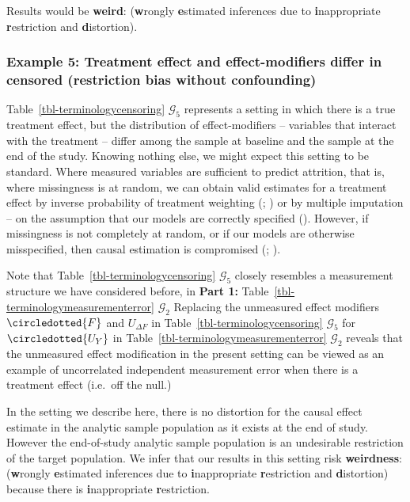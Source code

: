 \documentclass[
  single column]{article}
\begin{document}
Results would be \textbf{weird}: (\textbf{w}rongly \textbf{e}stimated
inferences due to \textbf{i}nappropriate \textbf{r}estriction and
\textbf{d}istortion).

\subsubsection{Example 5: Treatment effect and effect-modifiers differ
in censored (restriction bias without
confounding)}\label{example-5-treatment-effect-and-effect-modifiers-differ-in-censored-restriction-bias-without-confounding}

Table~\ref{tbl-terminologycensoring} \(\mathcal{G}_5\) represents a
setting in which there is a true treatment effect, but the distribution
of effect-modifiers -- variables that interact with the treatment --
differ among the sample at baseline and the sample at the end of the
study. Knowing nothing else, we might expect this setting to be
standard. Where measured variables are sufficient to predict attrition,
that is, where missingness is at random, we can obtain valid estimates
for a treatment effect by inverse probability of treatment weighting
(;
) or by multiple
imputation -- on the assumption that our models are correctly specified
(). However, if
missingness is not completely at random, or if our models are otherwise
misspecified, then causal estimation is compromised
(;
).

Note that Table~\ref{tbl-terminologycensoring} \(\mathcal{G}_5\) closely
resembles a measurement structure we have considered before, in
\textbf{Part 1:} Table~\ref{tbl-terminologymeasurementerror}
\(\mathcal{G}_2\) Replacing the unmeasured effect modifiers
\(\circledotted{F}\) and \(U_{\Delta F}\) in
Table~\ref{tbl-terminologycensoring} \(\mathcal{G}_5\) for
\(\circledotted{U_Y}\) in Table~\ref{tbl-terminologymeasurementerror}
\(\mathcal{G}_2\) reveals that the unmeasured effect modification in the
present setting can be viewed as an example of uncorrelated independent
measurement error when there is a treatment effect (i.e.~off the null.)

In the setting we describe here, there is no distortion for the causal
effect estimate in the analytic sample population as it exists at the
end of study. However the end-of-study analytic sample population is an
undesirable restriction of the target population. We infer that our
results in this setting risk \textbf{weirdness}: (\textbf{w}rongly
\textbf{e}stimated inferences due to \textbf{i}nappropriate
\textbf{r}estriction and \textbf{d}istortion) because there is
\textbf{i}nappropriate \textbf{r}estriction.
\end{document}
